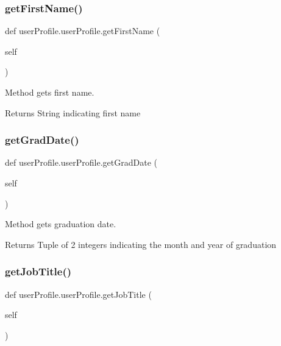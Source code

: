 \subsubsection{\texorpdfstring{get\+First\+Name()}{getFirstName()}}
{\footnotesize\ttfamily def user\+Profile.\+user\+Profile.\+get\+First\+Name (\begin{DoxyParamCaption}\item[{}]{self }\end{DoxyParamCaption})}



Method gets first name. 

\begin{DoxyReturn}{Returns}
String indicating first name 
\end{DoxyReturn}
\mbox{\label{classuserProfile_1_1userProfile_acdaf40b01b5086ab70b8802ba944b337}} 
\subsubsection{\texorpdfstring{get\+Grad\+Date()}{getGradDate()}}
{\footnotesize\ttfamily def user\+Profile.\+user\+Profile.\+get\+Grad\+Date (\begin{DoxyParamCaption}\item[{}]{self }\end{DoxyParamCaption})}



Method gets graduation date. 

\begin{DoxyReturn}{Returns}
Tuple of 2 integers indicating the month and year of graduation 
\end{DoxyReturn}
\mbox{\label{classuserProfile_1_1userProfile_a8cbc67cf93584ff8a9bd0d032c0a1c44}} 
\subsubsection{\texorpdfstring{get\+Job\+Title()}{getJobTitle()}}
{\footnotesize\ttfamily def user\+Profile.\+user\+Profile.\+get\+Job\+Title (\begin{DoxyParamCaption}\item[{}]{self }\end{DoxyParamCaption})}



